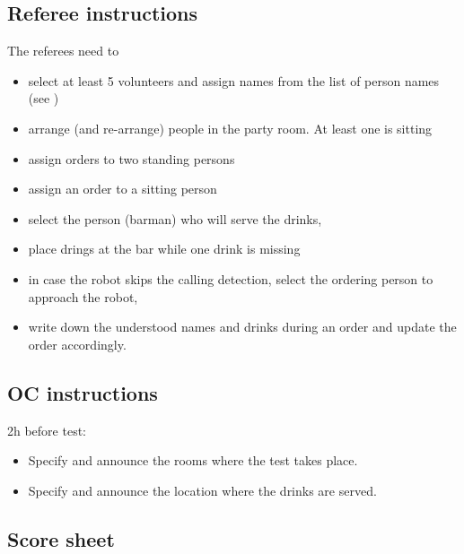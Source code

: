 \subsection{Referee instructions}

The referees need to
\begin{itemize}
	\item select at least 5 volunteers and assign names from the list of person names (see )
	\item arrange (and re-arrange) people in the party room. At least one is sitting
	\item assign orders to two standing persons
	\item assign an order to a sitting person
	\item select the person (barman) who will serve the drinks,
	\item place drings at the bar while one drink is missing
	\item in case the robot skips the calling detection, select the ordering person to approach the robot,
	\item write down the understood names and drinks during an order and update the order accordingly.
\end{itemize}

\subsection{OC instructions}

2h before test:
\begin{itemize}
	\item Specify and announce the rooms where the test takes place.
	\item Specify and announce the location where the drinks are served.
\end{itemize}

\newpage
\subsection{Score sheet}


